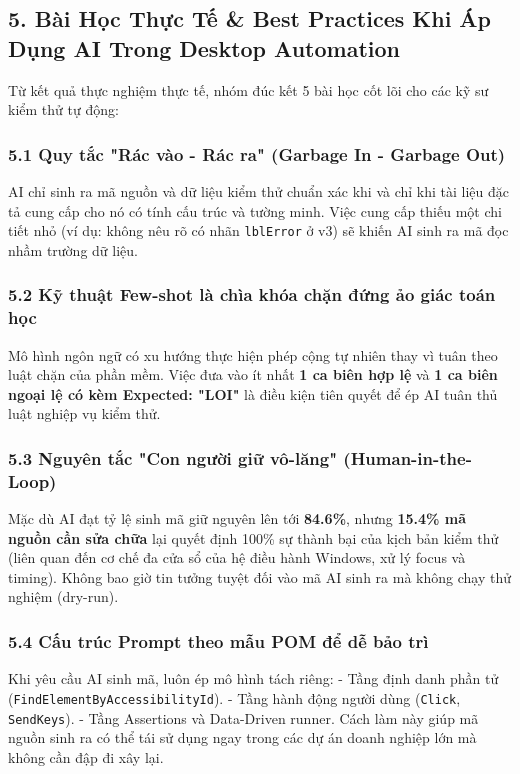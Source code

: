\subsection{5. Bài Học Thực Tế \& Best Practices Khi Áp Dụng AI Trong Desktop Automation}

Từ kết quả thực nghiệm thực tế, nhóm đúc kết 5 bài học cốt lõi cho các kỹ sư kiểm thử tự động:

\subsubsection{5.1 Quy tắc "Rác vào - Rác ra" (Garbage In - Garbage Out)}
AI chỉ sinh ra mã nguồn và dữ liệu kiểm thử chuẩn xác khi và chỉ khi tài liệu đặc tả cung cấp cho nó có tính cấu trúc và tường minh. Việc cung cấp thiếu một chi tiết nhỏ (ví dụ: không nêu rõ có nhãn \texttt{lblError} ở v3) sẽ khiến AI sinh ra mã đọc nhầm trường dữ liệu.

\subsubsection{5.2 Kỹ thuật Few-shot là chìa khóa chặn đứng ảo giác toán học}
Mô hình ngôn ngữ có xu hướng thực hiện phép cộng tự nhiên thay vì tuân theo luật chặn của phần mềm. Việc đưa vào ít nhất \textbf{1 ca biên hợp lệ} và \textbf{1 ca biên ngoại lệ có kèm Expected: "LOI"} là điều kiện tiên quyết để ép AI tuân thủ luật nghiệp vụ kiểm thử.

\subsubsection{5.3 Nguyên tắc "Con người giữ vô-lăng" (Human-in-the-Loop)}
Mặc dù AI đạt tỷ lệ sinh mã giữ nguyên lên tới \textbf{84.6\%}, nhưng \textbf{15.4\% mã nguồn cần sửa chữa} lại quyết định 100\% sự thành bại của kịch bản kiểm thử (liên quan đến cơ chế đa cửa sổ của hệ điều hành Windows, xử lý focus và timing). Không bao giờ tin tưởng tuyệt đối vào mã AI sinh ra mà không chạy thử nghiệm (dry-run).

\subsubsection{5.4 Cấu trúc Prompt theo mẫu POM để dễ bảo trì}
Khi yêu cầu AI sinh mã, luôn ép mô hình tách riêng:
- Tầng định danh phần tử (\texttt{FindElementByAccessibilityId}).
- Tầng hành động người dùng (\texttt{Click}, \texttt{SendKeys}).
- Tầng Assertions và Data-Driven runner.
Cách làm này giúp mã nguồn sinh ra có thể tái sử dụng ngay trong các dự án doanh nghiệp lớn mà không cần đập đi xây lại.


